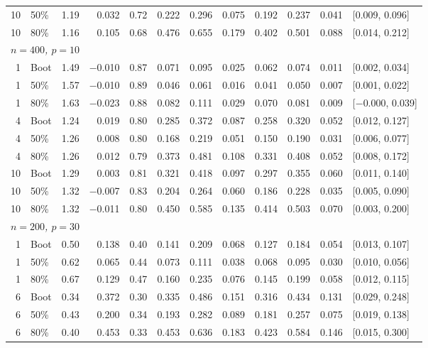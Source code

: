 \documentclass[11pt]{article}
\theoremstyle{plain}
\theoremstyle{definition}
\theoremstyle{remark}
\begin{document}
\begin{table}[htbp!]
\begin{tabular}{rlrrrrrrrrrl}
		10 & 50\% & 1.19 & 0.032    & 0.72 & 0.222 & 0.296 & 0.075 & 0.192 & 0.237 & 0.041 & [0.009, 0.096] \\
		10 & 80\% & 1.16 & 0.105    & 0.68 & 0.476 & 0.655 & 0.179 & 0.402 & 0.501 & 0.088 & [0.014, 0.212] \\[4pt]
		\multicolumn{12}{l}{\textit{$n = 400$, $p = 10$}} \\[2pt]
		1  & Boot & 1.49 & $-$0.010 & 0.87 & 0.071 & 0.095 & 0.025 & 0.062 & 0.074 & 0.011 & [0.002, 0.034] \\
		1  & 50\% & 1.57 & $-$0.010 & 0.89 & 0.046 & 0.061 & 0.016 & 0.041 & 0.050 & 0.007 & [0.001, 0.022] \\
		1  & 80\% & 1.63 & $-$0.023 & 0.88 & 0.082 & 0.111 & 0.029 & 0.070 & 0.081 & 0.009 & [$-$0.000, 0.039] \\
		4  & Boot & 1.24 & 0.019    & 0.80 & 0.285 & 0.372 & 0.087 & 0.258 & 0.320 & 0.052 & [0.012, 0.127] \\
		4  & 50\% & 1.26 & 0.008    & 0.80 & 0.168 & 0.219 & 0.051 & 0.150 & 0.190 & 0.031 & [0.006, 0.077] \\
		4  & 80\% & 1.26 & 0.012    & 0.79 & 0.373 & 0.481 & 0.108 & 0.331 & 0.408 & 0.052 & [0.008, 0.172] \\
		10 & Boot & 1.29 & 0.003    & 0.81 & 0.321 & 0.418 & 0.097 & 0.297 & 0.355 & 0.060 & [0.011, 0.140] \\
		10 & 50\% & 1.32 & $-$0.007 & 0.83 & 0.204 & 0.264 & 0.060 & 0.186 & 0.228 & 0.035 & [0.005, 0.090] \\
		10 & 80\% & 1.32 & $-$0.011 & 0.80 & 0.450 & 0.585 & 0.135 & 0.414 & 0.503 & 0.070 & [0.003, 0.200] \\[4pt]
		\multicolumn{12}{l}{\textit{$n = 200$, $p = 30$}} \\[2pt]
		1  & Boot & 0.50 & 0.138    & 0.40 & 0.141 & 0.209 & 0.068 & 0.127 & 0.184 & 0.054 & [0.013, 0.107] \\
		1  & 50\% & 0.62 & 0.065    & 0.44 & 0.073 & 0.111 & 0.038 & 0.068 & 0.095 & 0.030 & [0.010, 0.056] \\
		1  & 80\% & 0.67 & 0.129    & 0.47 & 0.160 & 0.235 & 0.076 & 0.145 & 0.199 & 0.058 & [0.012, 0.115] \\
		6  & Boot & 0.34 & 0.372    & 0.30 & 0.335 & 0.486 & 0.151 & 0.316 & 0.434 & 0.131 & [0.029, 0.248] \\
		6  & 50\% & 0.43 & 0.200    & 0.34 & 0.193 & 0.282 & 0.089 & 0.181 & 0.257 & 0.075 & [0.019, 0.138] \\
		6  & 80\% & 0.40 & 0.453    & 0.33 & 0.453 & 0.636 & 0.183 & 0.423 & 0.584 & 0.146 & [0.015, 0.300] \\

\end{tabular}
\end{table}
\end{document}
